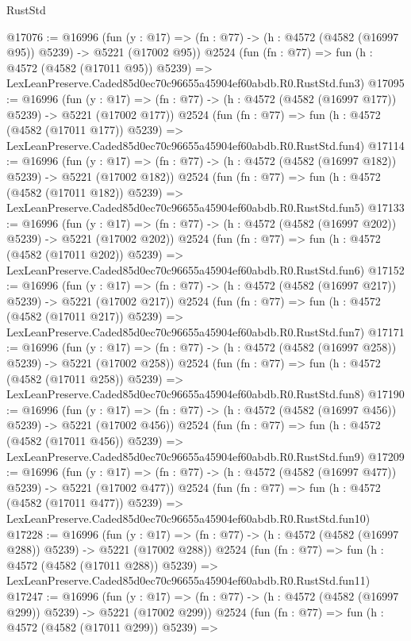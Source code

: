\begin{lexlean}{RustStd}
\begin{coremodule}
@17076 := @16996
    (fun (y : @17) => (fn : @77) -> (h : @4572 (@4582 (@16997 @95)) @5239) -> @5221 (@17002 @95))
    @2524
    (fun (fn : @77) =>
    fun (h : @4572 (@4582 (@17011 @95)) @5239) =>
    LexLeanPreserve.Caded85d0ec70c96655a45904ef60abdb.R0.RustStd.fun3)
@17095 := @16996
    (fun (y : @17) => (fn : @77) -> (h : @4572 (@4582 (@16997 @177)) @5239) -> @5221 (@17002 @177))
    @2524
    (fun (fn : @77) =>
    fun (h : @4572 (@4582 (@17011 @177)) @5239) =>
    LexLeanPreserve.Caded85d0ec70c96655a45904ef60abdb.R0.RustStd.fun4)
@17114 := @16996
    (fun (y : @17) => (fn : @77) -> (h : @4572 (@4582 (@16997 @182)) @5239) -> @5221 (@17002 @182))
    @2524
    (fun (fn : @77) =>
    fun (h : @4572 (@4582 (@17011 @182)) @5239) =>
    LexLeanPreserve.Caded85d0ec70c96655a45904ef60abdb.R0.RustStd.fun5)
@17133 := @16996
    (fun (y : @17) => (fn : @77) -> (h : @4572 (@4582 (@16997 @202)) @5239) -> @5221 (@17002 @202))
    @2524
    (fun (fn : @77) =>
    fun (h : @4572 (@4582 (@17011 @202)) @5239) =>
    LexLeanPreserve.Caded85d0ec70c96655a45904ef60abdb.R0.RustStd.fun6)
@17152 := @16996
    (fun (y : @17) => (fn : @77) -> (h : @4572 (@4582 (@16997 @217)) @5239) -> @5221 (@17002 @217))
    @2524
    (fun (fn : @77) =>
    fun (h : @4572 (@4582 (@17011 @217)) @5239) =>
    LexLeanPreserve.Caded85d0ec70c96655a45904ef60abdb.R0.RustStd.fun7)
@17171 := @16996
    (fun (y : @17) => (fn : @77) -> (h : @4572 (@4582 (@16997 @258)) @5239) -> @5221 (@17002 @258))
    @2524
    (fun (fn : @77) =>
    fun (h : @4572 (@4582 (@17011 @258)) @5239) =>
    LexLeanPreserve.Caded85d0ec70c96655a45904ef60abdb.R0.RustStd.fun8)
@17190 := @16996
    (fun (y : @17) => (fn : @77) -> (h : @4572 (@4582 (@16997 @456)) @5239) -> @5221 (@17002 @456))
    @2524
    (fun (fn : @77) =>
    fun (h : @4572 (@4582 (@17011 @456)) @5239) =>
    LexLeanPreserve.Caded85d0ec70c96655a45904ef60abdb.R0.RustStd.fun9)
@17209 := @16996
    (fun (y : @17) => (fn : @77) -> (h : @4572 (@4582 (@16997 @477)) @5239) -> @5221 (@17002 @477))
    @2524
    (fun (fn : @77) =>
    fun (h : @4572 (@4582 (@17011 @477)) @5239) =>
    LexLeanPreserve.Caded85d0ec70c96655a45904ef60abdb.R0.RustStd.fun10)
@17228 := @16996
    (fun (y : @17) => (fn : @77) -> (h : @4572 (@4582 (@16997 @288)) @5239) -> @5221 (@17002 @288))
    @2524
    (fun (fn : @77) =>
    fun (h : @4572 (@4582 (@17011 @288)) @5239) =>
    LexLeanPreserve.Caded85d0ec70c96655a45904ef60abdb.R0.RustStd.fun11)
@17247 := @16996
    (fun (y : @17) => (fn : @77) -> (h : @4572 (@4582 (@16997 @299)) @5239) -> @5221 (@17002 @299))
    @2524
    (fun (fn : @77) =>
    fun (h : @4572 (@4582 (@17011 @299)) @5239) =>

\end{coremodule}
\end{lexlean}
